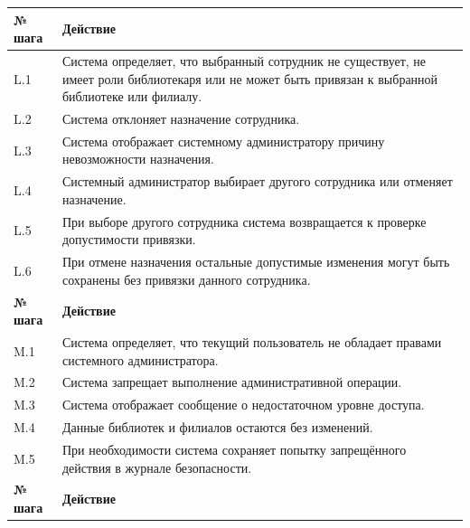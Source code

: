 \documentclass[12pt,a4paper]{article}
\begin{document}
\begin{xltabular}{\textwidth}{
				|>{\raggedright\arraybackslash}p{2.7cm}
				|>{\raggedright\arraybackslash}X|
			}
			
			\textbf{№ шага} & \textbf{Действие} \\
			\hline
			
			L.1 & Система определяет, что выбранный сотрудник не существует, не имеет
			роли библиотекаря или не может быть привязан к выбранной библиотеке
			или филиалу. \\
			\hline
			L.2 & Система отклоняет назначение сотрудника. \\
			\hline
			L.3 & Система отображает системному администратору причину невозможности
			назначения. \\
			\hline
			L.4 & Системный администратор выбирает другого сотрудника или отменяет
			назначение. \\
			\hline
			L.5 & При выборе другого сотрудника система возвращается к проверке
			допустимости привязки. \\
			\hline
			L.6 & При отмене назначения остальные допустимые изменения могут быть
			сохранены без привязки данного сотрудника. \\
			\hline
			
			
			\textbf{№ шага} & \textbf{Действие} \\
			\hline
			
			M.1 & Система определяет, что текущий пользователь не обладает правами
			системного администратора. \\
			\hline
			M.2 & Система запрещает выполнение административной операции. \\
			\hline
			M.3 & Система отображает сообщение о недостаточном уровне доступа. \\
			\hline
			M.4 & Данные библиотек и филиалов остаются без изменений. \\
			\hline
			M.5 & При необходимости система сохраняет попытку запрещённого действия
			в журнале безопасности. \\
			\hline
			
			
			\textbf{№ шага} & \textbf{Действие} \\
			\hline
			

\end{xltabular}
\end{document}
